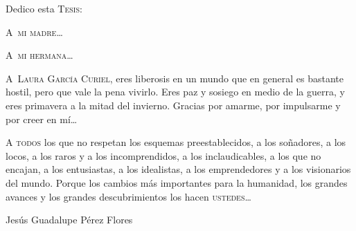 \clearpage
\begin{changemargin}{2cm}{2cm} 

    \thispagestyle{empty}
    \vspace*{\fill}
    

\begin{center}
    Dedico esta \textsc{Tesis}:
\end{center}

\begin{center}
    A~\textsc{mi madre}\ldots
\end{center}

\begin{center}
    A~\textsc{mi hermana}\ldots
\end{center}

\begin{center}
    A~\textsc{Laura García Curiel}, eres liberosis en un mundo que en general es bastante hostil, pero que vale la pena vivirlo. Eres paz y sosiego en medio de la guerra, y eres primavera a la mitad del invierno. Gracias por amarme, por impulsarme y por creer en mí\ldots
\end{center}
  
\begin{center}
    \textsc{A todos} los que no respetan los esquemas preestablecidos, a los soñadores, a los locos, a los raros y a los incomprendidos, a los inclaudicables, a los que no encajan, a los entusiastas, a los idealistas, a los emprendedores y a los visionarios del mundo. Porque los cambios más importantes para la humanidad, los grandes avances y los grandes descubrimientos los hacen \textsc{ustedes}\ldots
\end{center}
    
\begin{center}
	Jesús Guadalupe Pérez Flores
\end{center}

\begin{center}
	\Huge
	\textxswup
\end{center}

    \vspace*{\fill}

\end{changemargin}
\clearpage
